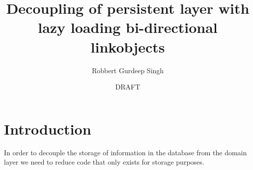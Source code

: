 \documentclass[11pt]{article}
\title{Decoupling of persistent layer with lazy loading bi-directional linkobjects}
\author{Robbert Gurdeep Singh}
\date{DRAFT}
\begin{document}


\section{Introduction}
\label{sec:inro}
In order to decouple the storage of information in the database from the domain layer we need to reduce code that only exists for  storage purposes.
\end{document}
